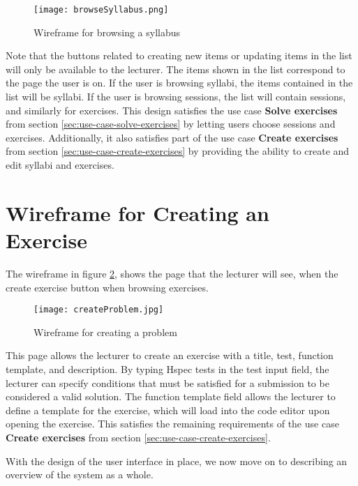 \begin{figure}[H]
    \texttt{[image: browseSyllabus.png]}
    \centering
    \caption{Wireframe for browsing a syllabus}
    \label{fig:wfSyllabus}
\end{figure}
Note that the buttons related to creating new items or updating items in the list will only be available to the lecturer. The items shown in the list correspond to the page the user is on. If the user is browsing syllabi, the items contained in the list will be syllabi. If the user is browsing sessions, the list will contain sessions, and similarly for exercises. This design satisfies the use case \textbf{Solve exercises} from section \ref{sec:use-case-solve-exercises} by letting users choose sessions and exercises. Additionally, it also satisfies part of the use case \textbf{Create exercises} from section \ref{sec:use-case-create-exercises} by providing the ability to create and edit syllabi and exercises.

\section{Wireframe for Creating an Exercise}
The wireframe in figure \ref{fig:wfProblem}, shows the page that the lecturer will see, when the create exercise button when browsing exercises.
\begin{figure}[H]
	\texttt{[image: createProblem.jpg]}
	\centering
	\caption{Wireframe for creating a problem}
	\label{fig:wfProblem}
\end{figure}

This page allows the lecturer to create an exercise with a title, test, function template, and description.
By typing Hspec tests in the test input field, the lecturer can specify conditions that must be satisfied for a submission to be considered a valid solution.
The function template field allows the lecturer to define a template for the exercise, which will load into the code editor upon opening the exercise.
This satisfies the remaining requirements of the use case \textbf{Create exercises} from section \ref{sec:use-case-create-exercises}.

With the design of the user interface in place, we now move on to describing an overview of the system as a whole.
